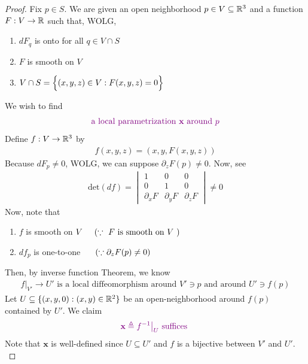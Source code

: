 \documentclass{report}
\begin{document}
\begin{proof}
Fix $p \in S$. We are given an open neighborhood $p \in V \subseteq \mathbb{R}^3$ and a function $F:V\rightarrow \mathbb{R}$ such that, WOLG, 
\begin{enumerate}[label=(\alph*)]
  \item $dF_q$ is onto for all $q\in V\cap S$
  \item $F$ is smooth on  $V$
  \item $V\cap S=\Big\{ (x,y,z)\in V: F(x,y,z)=0 \Big\}$ 
\end{enumerate}


We wish to find 
\begin{align*}
\textcolor{violet}{\text{ a local parametrization $\textbf{x}$ around $p$ }}
\end{align*}
Define $f:V \rightarrow \mathbb{R}^3$ by 
\begin{align*}
f(x,y,z)=(x,y,F(x,y,z))
\end{align*}
Because $dF_p\neq 0$, WOLG, we can suppose $\partial _zF(p)\neq 0$. Now, see 
\begin{align*}
\text{det}(df)=\begin{vmatrix}
  1 & 0 & 0\\
  0 & 1 & 0\\
  \partial_x F & \partial_y F & \partial _z F
\end{vmatrix}\neq 0
\end{align*}
Now, note that 
\begin{enumerate}[label=(\alph*)]
  \item $f$ is smooth on $V\hspace{0.5cm}(\because \text{ $F$ is smooth on $V$ })$  
  \item $df_p$ is one-to-one $\hspace{0.5cm}(\because \partial_zF(p)\neq 0)$  
\end{enumerate}
Then, by inverse function Theorem, we know  
\begin{align*}
f\big|_{V'}\to U'\text{ is a local diffeomorphism around $V'\ni p$ and around $U'\ni f(p)$}
\end{align*}
Let $U\subseteq \{ (x,y,0):(x,y)\in\mathbb{R}^2 \}$ be an open-neighborhood around $f(p)$ contained by $U'$. We claim  
\begin{align*}
  \textcolor{violet}{\textbf{x}\triangleq f^{-1}\big|_U\text{ suffices }}
\end{align*}
Note that $\textbf{x}$ is well-defined since $U\subseteq U'$ and $f$ is a bijective between  $V'$ and $U'$.\\



\end{proof}
\end{document}
